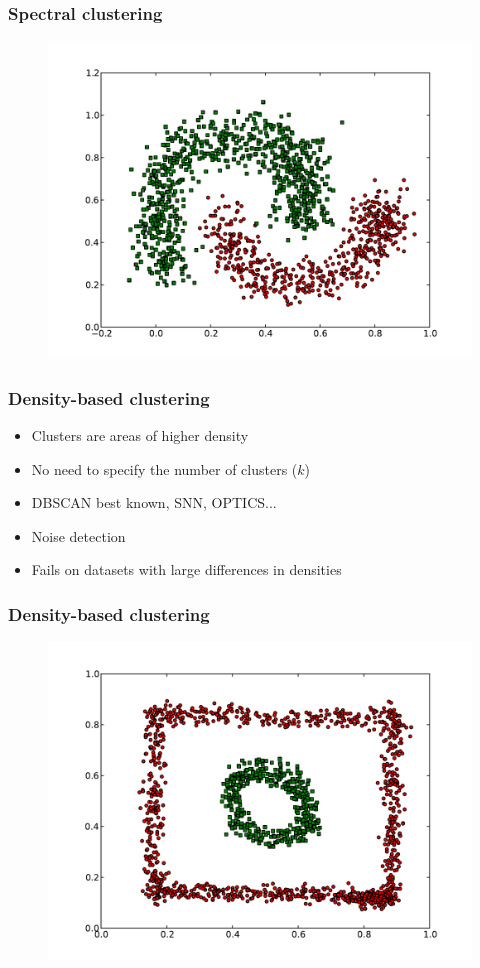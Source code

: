 \documentclass{beamer}
\begin{document}
\begin{frame}
\frametitle{Spectral clustering}
    \begin{figure}[]
    \includegraphics[scale=0.5]{spectral_half-moons.pdf}
    \end{figure}
\end{frame}



\begin{frame}
\frametitle{Density-based clustering}
    \begin{itemize}
    \item Clusters are areas of higher density
    \item No need to specify the number of clusters ($k$)
	\item DBSCAN best known, SNN, OPTICS...
    \item Noise detection
   	\item Fails on datasets with large differences in densities
    \end{itemize}
\end{frame}

\begin{frame}
\frametitle{Density-based clustering}
    \begin{figure}[]
    \includegraphics[scale=0.5]{dbscan_circle-weird.pdf}
    \end{figure}
\end{frame}
\end{document}
